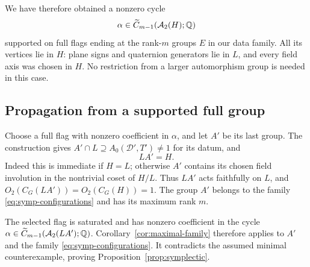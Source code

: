 We have therefore obtained a nonzero cycle
\[
\alpha\in\widetilde C_{m-1}(\mathcal A_2(H);\mathbb Q)
\]
supported on full flags ending at the rank-$m$ groups $E$ in our
data family.  All its vertices lie in $H$: plane signs and
quaternion generators lie in $L$, and every field axis was chosen
in $H$.  No restriction from a larger automorphism group is needed
in this case.

\subsection{Propagation from a supported full group}

Choose a full flag with nonzero coefficient in $\alpha$, and let
$A'$ be its last group.  The construction gives
$A'\cap L\supseteq A_0(\mathcal D',T')\ne1$ for its datum, and
\[
LA'=H.
\]
Indeed this is immediate if $H=L$; otherwise $A'$ contains its
chosen field involution in the nontrivial coset of $H/L$.  Thus
$LA'$ acts faithfully on $L$, and
$O_2(C_G(LA'))=O_2(C_G(H))=1$.  The group $A'$ belongs to the
family \eqref{eq:symp-configurations} and has its maximum rank $m$.

The selected flag is saturated and has nonzero coefficient in the
cycle $\alpha\in\widetilde C_{m-1}(\mathcal A_2(LA');\mathbb Q)$.
Corollary~\ref{cor:maximal-family} therefore applies to $A'$ and the
family \eqref{eq:symp-configurations}.  It contradicts the assumed
minimal counterexample, proving Proposition~\ref{prop:symplectic}.
